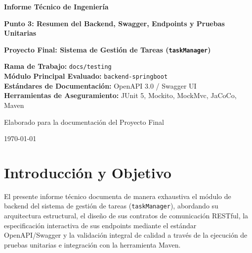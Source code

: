 \documentclass[12pt,a4paper]{article}
\begin{document}
\begin{titlepage}
    \centering
    \vspace*{1cm}
    {\Huge \textbf{Informe Técnico de Ingeniería}\par}
    \vspace{0.5cm}
    {\LARGE \textbf{Punto 3: Resumen del Backend, Swagger, Endpoints y Pruebas Unitarias}\par}
    \vspace{1.5cm}
    {\Large \textbf{Proyecto Final: Sistema de Gestión de Tareas (\texttt{taskManager})}\par}
    \vspace{2cm}
    
    \begin{tcolorbox}[colback=backcolour,colframe=primaryblue,arc=5pt,boxrule=1.5pt]
        \centering
        \vspace{0.3cm}
        \textbf{Rama de Trabajo:} \texttt{docs/testing} \\
        \textbf{Módulo Principal Evaluado:} \texttt{backend-springboot} \\
        \textbf{Estándares de Documentación:} OpenAPI 3.0 / Swagger UI \\
        \textbf{Herramientas de Aseguramiento:} JUnit 5, Mockito, MockMvc, JaCoCo, Maven
        \vspace{0.3cm}
    \end{tcolorbox}
    
    \vfill
    {\large Elaborado para la documentación del Proyecto Final\par}
    \vspace{0.5cm}
    {\large \today\par}
\end{titlepage}

\tableofcontents
\newpage

\section{Introducción y Objetivo}
El presente informe técnico documenta de manera exhaustiva el módulo de backend del sistema de gestión de tareas (\texttt{taskManager}), abordando su arquitectura estructural, el diseño de sus contratos de comunicación RESTful, la especificación interactiva de sus endpoints mediante el estándar OpenAPI/Swagger y la validación integral de calidad a través de la ejecución de pruebas unitarias e integración con la herramienta Maven.
\end{document}
